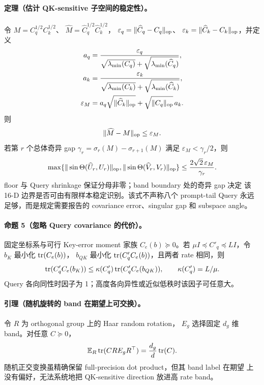 \paragraph{定理（估计 QK-sensitive 子空间的稳定性）。}
令
$M=C_q^{1/2}C_k^{1/2}$、
$\widehat M=\widehat C_q^{1/2}\widehat C_k^{1/2}$，
$\varepsilon_q=\|\widehat C_q-C_q\|_{\mathrm{op}}$、
$\varepsilon_k=\|\widehat C_k-C_k\|_{\mathrm{op}}$，并定义
\begin{align}
 a_q&=\frac{\varepsilon_q}
 {\sqrt{\lambda_{\min}(C_q)}
 +\sqrt{\lambda_{\min}(\widehat C_q)}},\\
 a_k&=\frac{\varepsilon_k}
 {\sqrt{\lambda_{\min}(C_k)}
 +\sqrt{\lambda_{\min}(\widehat C_k)}},\\
 \varepsilon_M&=
 a_q\sqrt{\|\widehat C_k\|_{\mathrm{op}}}
 +\sqrt{\|C_q\|_{\mathrm{op}}}\,a_k .
 \label{eq:qk-moment-product-perturbation}
\end{align}
则
\begin{equation}
 \|\widehat M-M\|_{\mathrm{op}}\le\varepsilon_M.
 \label{eq:qk-product-stability}
\end{equation}
若第 $r$ 个总体奇异 gap
$\gamma_r=\sigma_r(M)-\sigma_{r+1}(M)$ 满足
$\varepsilon_M<\gamma_r/2$，则
\begin{equation}
 \max\{\|\sin\Theta(\widehat U_r,U_r)\|_{\mathrm{op}},
 \|\sin\Theta(\widehat V_r,V_r)\|_{\mathrm{op}}\}
 \le\frac{2\sqrt2\,\varepsilon_M}{\gamma_r}.
 \label{eq:qk-subspace-stability}
\end{equation}
floor 与 Query shrinkage 保证分母非零；band boundary 处的奇异 gap 决定
该 16-D 边界是否可由有限样本稳定识别。该式不声称八个 prompt-tail Query
永远足够，而是规定需要报告的 covariance error、singular gap 和 subspace
angle。

\paragraph{命题 5（忽略 Query covariance 的代价）。}
固定坐标系与可行 Key-error moment 家族 $C_e(b)\succeq0$。若
$\mu I\preceq C'_q\preceq LI$，令 $b_K$ 最小化 $\operatorname{tr}(C_e(b))$，
$b_{QK}$ 最小化 $\operatorname{tr}(C'_qC_e(b))$，且两者 rate 相同，则
\begin{equation}
 \operatorname{tr}(C'_qC_e(b_K))
 \le\kappa(C'_q)\operatorname{tr}(C'_qC_e(b_{QK})),\qquad
 \kappa(C'_q)=L/\mu.
 \label{eq:key-only-condition-bound}
\end{equation}
Query 各向同性时因子为 1；高度各向异性或近似低秩时该因子可任意大。

\paragraph{引理（随机旋转的 band 在期望上可交换）。}
令 $R$ 为 orthogonal group 上的 Haar random rotation，
$E_g$ 选择固定 $d_g$ 维 band。对任意 $C\succeq0$，
\begin{equation}
 \mathbb E_R\operatorname{tr}(CRE_gR^\top)
 =\frac{d_g}{d}\operatorname{tr}(C).
 \label{eq:random-band-exchangeability}
\end{equation}
随机正交变换虽精确保留 full-precision dot product，但其 band label 在期望
上没有偏好，无法系统地把 QK-sensitive direction 放进高 rate band。


